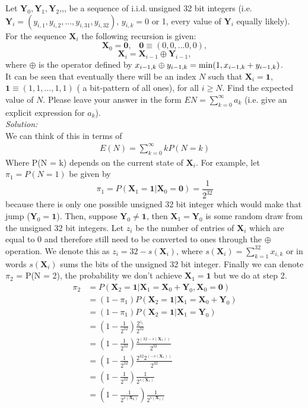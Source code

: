 \documentclass[10pt]{amsart}
\begin{document}
\newpage

 Let ${\bm Y}_0, {\bm Y}_1, {\bm Y}_2$,,, be a sequence of i.i.d.\,unsigned 32 bit integers (i.e. ${\bm Y}_i=(y_{i,1},y_{i,2},...,y_{i,31},y_{i,32})$, $y_{i,k}=0$ or 1, every value of ${\bm Y}_i$ equally likely).
\\

\noindent For the sequence ${\bm X}_i$ the following recursion is given:
$${\bm X}_0={\bm 0}, \,\,\,\,\, {\bm 0}\equiv(0,0,...0,0),$$
$${\bm X}_i={\bm X}_{i-1} \oplus {\bm Y}_{i-1},$$
where $\oplus$ is the operator defined by $x_{i-1,k} \oplus y_{i-1,k}={\rm min}(1,x_{i-1,k}+y_{i-1,k})$.
\\

\noindent It can be seen that eventually there will be an index $N$ such that ${\bm X}_i={\bm 1}$, ${\bm 1}\equiv(1,1,...,1,1)$ ( a bit-pattern of all ones), for all $i\geq N$. Find the expected value of $N$. Please leave your answer in the form $EN=\sum_{k=0}^{\infty} a_k$ (i.e. give an explicit expression for $a_k$). \\ 

\noindent
\textit{Solution:} \\
We can think of this in terms of 
\begin{align*}
E (N) = \sum_{k=0}^\infty k P(N = k)
\end{align*}
Where P(N = k) depends on the current state of $\bm X_i$.
For example, let $\pi_1 = P(N = 1)$ be given by
$$\pi_1 = P(\bm X_1 = \bm 1| \bm X_0 = \bm 0) = \frac 1 {2^{32}} $$
because there is only one possible unsigned 32 bit integer which would make that jump ($\bm Y_0 = \bm 1$).
Then, suppose $\bm Y_0 \neq \bm 1$, then $\bm X_1 = \bm Y_0$ is some random draw from the unsigned 32 bit integers.
Let $z_i$ be the number of entries of $\bm X_i$ which are equal to 0 and therefore still need to be converted to ones through the $\oplus$ operation.
We denote this as $z_i = 32 - s(\bm X_i)$, where $s(\bm X_i) = \sum_{k=1}^{32} x_{i,k}$ or in words $s(\bm X_i)$ sums the bits of the unsigned 32 bit integer.
Finally we can denote $\pi_2$ = P(N = 2), the probability we don't achieve $\bm X_1 = \bm 1$ but we do at step 2.
\begin{align*}
\pi_2 &= P(\bm X_2 = \bm 1| \bm X_1 = \bm X_0 + \bm Y_0, \bm X_0 = \bm 0) \\
	&= (1 - \pi_1)P(\bm X_2 = \bm 1| \bm X_1 = \bm X_0 + \bm Y_0) \\
	&= (1 - \pi_1)P(\bm X_2 = \bm 1| \bm X_1 = \bm Y_0) \\
	&= \left( 1 - \frac 1 {2^{32}} \right) \frac {2^{z_1}}{2^{32}} \\
	&= \left( 1 - \frac 1 {2^{32}} \right) \frac {2^{\left( 32 - s(\bm X_1)\right)}}{2^{32}} \\
	&= \left( 1 - \frac 1 {2^{32}} \right) \frac {2^{32} 2^{\left(-s(\bm X_1)\right)}}{2^{32}} \\
	&= \left( 1 - \frac 1 {2^{32}} \right) \frac 1 {2^{s(\bm X_1)}} \\
	&= \left( 1 - \frac 1 {2^{s(\bm X_0)}} \right) \frac 1 {2^{s(\bm X_1)}}
\end{align*}
\end{document}
